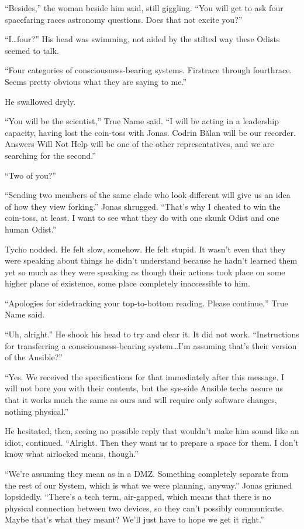``Besides,'' the woman beside him said, still giggling. ``You will get to ask four spacefaring races astronomy questions. Does that not excite you?''

``I\ldots four?'' His head was swimming, not aided by the stilted way these Odists seemed to talk.

``Four categories of consciousness-bearing systems. Firstrace through fourthrace. Seems pretty obvious what they are saying to me.''

He swallowed dryly.

``You will be the scientist,'' True Name said. ``I will be acting in a leadership capacity, having lost the coin-toss with Jonas. Codrin Bălan will be our recorder. Answers Will Not Help will be one of the other representatives, and we are searching for the second.''

``Two of you?''

``Sending two members of the same clade who look different will give us an idea of how they view forking.'' Jonas shrugged. ``That's why I cheated to win the coin-toss, at least. I want to see what they do with one skunk Odist and one human Odist.''

Tycho nodded. He felt slow, somehow. He felt stupid. It wasn't even that they were speaking about things he didn't understand because he hadn't learned them yet so much as they were speaking as though their actions took place on some higher plane of existence, some place completely inaccessible to him.

``Apologies for sidetracking your top-to-bottom reading. Please continue,'' True Name said.

``Uh, alright.'' He shook his head to try and clear it. It did not work. ``Instructions for transferring a consciousness-bearing system\ldots I'm assuming that's their version of the Ansible?''

``Yes. We received the specifications for that immediately after this message. I will not bore you with their contents, but the sys-side Ansible techs assure us that it works much the same as ours and will require only software changes, nothing physical.''

He hesitated, then, seeing no possible reply that wouldn't make him sound like an idiot, continued. ``Alright. Then they want us to prepare a space for them. I don't know what airlocked means, though.''

``We're assuming they mean as in a DMZ. Something completely separate from the rest of our System, which is what we were planning, anyway.'' Jonas grinned lopsidedly. ``There's a tech term, air-gapped, which means that there is no physical connection between two devices, so they can't possibly communicate. Maybe that's what they meant? We'll just have to hope we get it right.''

